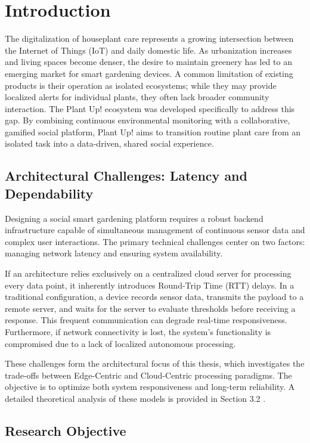 \section{Introduction}

The digitalization of houseplant care represents a growing intersection between the Internet of Things (IoT) and daily domestic life. As urbanization increases and living spaces become denser, the desire to maintain greenery has led to an emerging market for smart gardening devices. A common limitation of existing products is their operation as isolated ecosystems; while they may provide localized alerts for individual plants, they often lack broader community interaction. The Plant Up! ecosystem was developed specifically to address this gap. By combining continuous environmental monitoring with a collaborative, gamified social platform, Plant Up! aims to transition routine plant care from an isolated task into a data-driven, shared social experience.

\subsection{Architectural Challenges: Latency and Dependability}

Designing a social smart gardening platform requires a robust backend infrastructure capable of simultaneous management of continuous sensor data and complex user interactions. The primary technical challenges center on two factors: managing network latency and ensuring system availability.

If an architecture relies exclusively on a centralized cloud server for processing every data point, it inherently introduces Round-Trip Time (RTT) delays. In a traditional configuration, a device records sensor data, transmits the payload to a remote server, and waits for the server to evaluate thresholds before receiving a response. This frequent communication can degrade real-time responsiveness. Furthermore, if network connectivity is lost, the system's functionality is compromised due to a lack of localized autonomous processing.

These challenges form the architectural focus of this thesis, which investigates the trade-offs between Edge-Centric and Cloud-Centric processing paradigms. The objective is to optimize both system responsiveness and long-term reliability. A detailed theoretical analysis of these models is provided in Section 3.2 .

\subsection{Research Objective}


